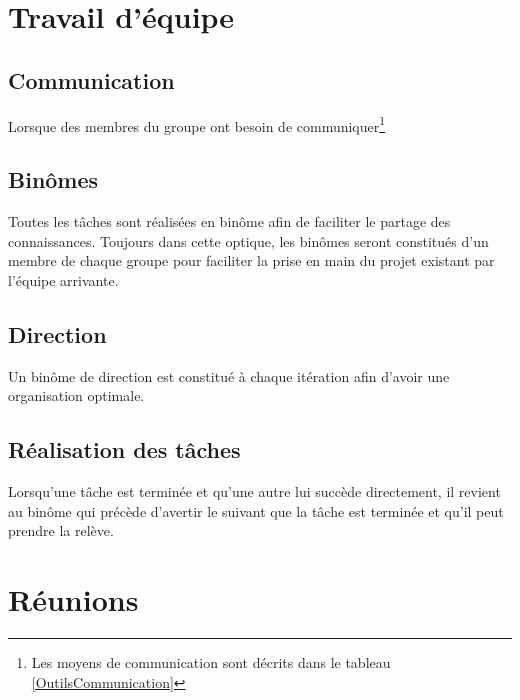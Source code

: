 \documentclass[11pt,fleqn]{report}
\begin{document}
\section{Travail d'équipe}
\subsection{Communication}
Lorsque des membres du groupe ont besoin de communiquer\footnote{Les moyens de communication sont décrits dans le tableau \ref{OutilsCommunication}}
\subsection{Binômes}
Toutes les tâches sont réalisées en binôme afin de faciliter le partage des connaissances. Toujours dans cette optique, les binômes seront constitués d'un membre de chaque groupe pour faciliter la prise en main du projet existant par l'équipe arrivante.
\subsection{Direction}
Un binôme de direction est constitué à chaque itération afin d'avoir une organisation optimale.
\subsection{Réalisation des tâches}
Lorsqu'une tâche est terminée et qu'une autre lui succède directement, il revient au binôme qui précède d'avertir le suivant que la tâche est terminée et qu'il peut prendre la relève.

\section{Réunions}
\end{document}
